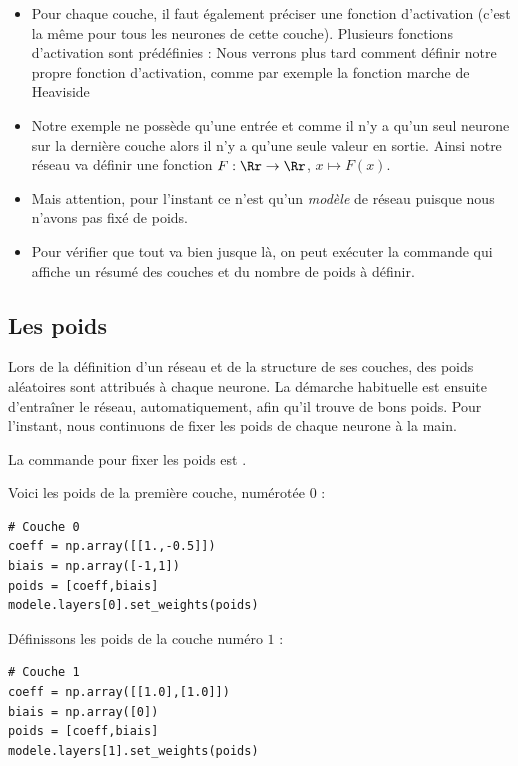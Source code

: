 \documentclass[11pt,class=report,crop=false]{standalone}
\begin{document}
\begin{itemize}
  \item Pour chaque couche, il faut également préciser une fonction d'activation (c'est la même pour tous les neurones de cette couche). Plusieurs fonctions d'activation sont prédéfinies :
  Nous verrons plus tard comment définir notre propre fonction d'activation, comme par exemple la fonction marche de Heaviside
  
  \item Notre exemple ne possède qu'une entrée et comme il n'y a qu'un seul neurone sur la dernière couche alors il n'y a qu'une seule valeur en sortie. Ainsi notre réseau va définir une fonction $F : \Rr \to \Rr$, $x \mapsto F(x)$.
  
  \item Mais attention, pour l'instant ce n'est qu'un \emph{modèle} de réseau puisque nous n'avons pas fixé de poids. 


  
  \item Pour vérifier que tout va bien jusque là, on peut exécuter la commande 
  qui affiche un résumé des couches et du nombre de poids à définir.
  
\end{itemize}


\subsection{Les poids}

Lors de la définition d'un réseau et de la structure de ses couches, des poids aléatoires sont attribués à chaque neurone. 
La démarche habituelle est ensuite d'entraîner le réseau, automatiquement, afin qu'il trouve de \og{}bons\fg{} poids. Pour l'instant, nous continuons de fixer les poids de chaque neurone à la main. 

La commande pour fixer les poids est . 

\bigskip

\begin{minipage}{0.55\textwidth}
Voici les poids de la première couche, numérotée $0$ :
\begin{lstlisting}
# Couche 0
coeff = np.array([[1.,-0.5]])
biais = np.array([-1,1])
poids = [coeff,biais]
modele.layers[0].set_weights(poids)
\end{lstlisting}
Définissons les poids de la couche numéro $1$ :
\begin{lstlisting}
# Couche 1
coeff = np.array([[1.0],[1.0]])
biais = np.array([0])
poids = [coeff,biais]
modele.layers[1].set_weights(poids)
\end{lstlisting} 
\end{minipage}
\begin{minipage}{0.40\textwidth}
\end{minipage}
\end{document}

